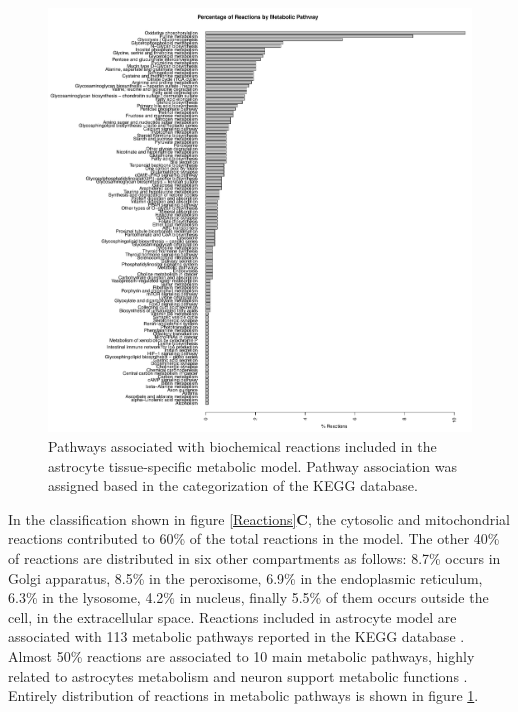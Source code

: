\begin{figure}
\begin{center}
\includegraphics[width=\textwidth]{neuroprotective/Pathways}
\end{center}
\caption{Pathways associated with biochemical reactions included in the astrocyte tissue-specific metabolic model. Pathway association was assigned based in the categorization of the KEGG database.}
\label{Pathways}
\end{figure}
In the classification shown in figure \ref{Reactions}\textbf{C}, the cytosolic and mitochondrial reactions contributed to 60\% of the total reactions in the model. The other 40\% of reactions are distributed in six other compartments as follows: 8.7\% occurs in Golgi apparatus, 8.5\% in the peroxisome, 6.9\% in the endoplasmic reticulum, 6.3\% in the lysosome, 4.2\% in nucleus, finally 5.5\% of them occurs outside the cell, in the extracellular space.
Reactions included in astrocyte model are associated with 113 metabolic pathways reported in the KEGG database \cite{Kanehisa2000}. Almost 50\% reactions are associated to 10 main metabolic pathways, highly related to astrocytes metabolism and neuron support metabolic functions \cite{Fitch1997,Ciccarelli2001,Cakir2007,Giaume2010, Sertbas2014, Sa2016}. Entirely distribution of reactions in metabolic pathways is shown in figure \ref{Pathways}. 
